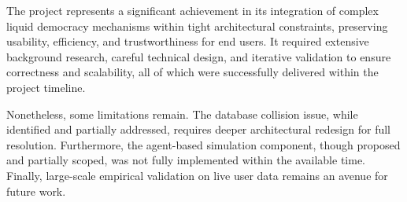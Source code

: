 The project represents a significant achievement in its integration of complex liquid democracy mechanisms within tight architectural constraints, preserving usability, efficiency, and trustworthiness for end users. It required extensive background research, careful technical design, and iterative validation to ensure correctness and scalability, all of which were successfully delivered within the project timeline.

Nonetheless, some limitations remain. The database collision issue, while identified and partially addressed, requires deeper architectural redesign for full resolution. Furthermore, the agent-based simulation component, though proposed and partially scoped, was not fully implemented within the available time. Finally, large-scale empirical validation on live user data remains an avenue for future work.